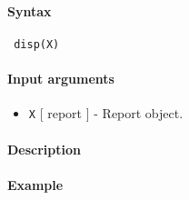 


	\paragraph{Syntax}
 
 \begin{verbatim}
 disp(X)
 \end{verbatim}
 
 \paragraph{Input arguments}
 
 \begin{itemize}
 \item
   \texttt{X} {[} report {]} - Report object.
 \end{itemize}
 
 \paragraph{Description}
 
 \paragraph{Example}


